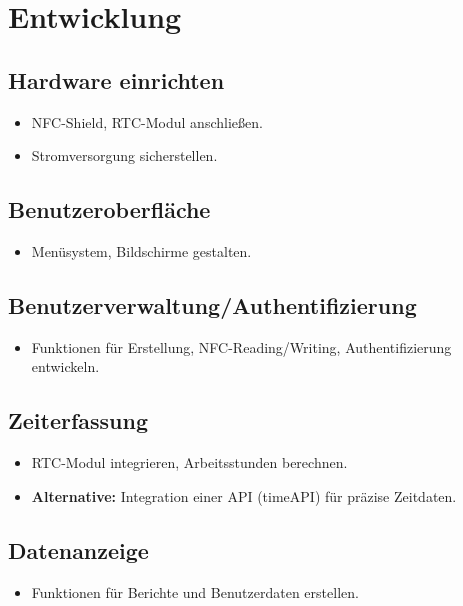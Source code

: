 \documentclass[../main.tex]{subfiles}
\begin{document}
\section{Entwicklung}

\subsection{Hardware einrichten}
\begin{itemize}
  \item NFC-Shield, RTC-Modul anschließen.
  \item Stromversorgung sicherstellen.
\end{itemize}

\subsection{Benutzeroberfläche}
\begin{itemize}
  \item Menüsystem, Bildschirme gestalten.
\end{itemize}

\subsection{Benutzerverwaltung/Authentifizierung}
\begin{itemize}
  \item Funktionen für Erstellung, NFC-Reading/Writing, Authentifizierung entwickeln.
\end{itemize}

\subsection{Zeiterfassung}
\begin{itemize}
  \item RTC-Modul integrieren, Arbeitsstunden berechnen.
  \item \textbf{Alternative:} Integration einer API (timeAPI) für präzise Zeitdaten.
\end{itemize}

\subsection{Datenanzeige}
\begin{itemize}
  \item Funktionen für Berichte und Benutzerdaten erstellen.
\end{itemize}
\end{document}
